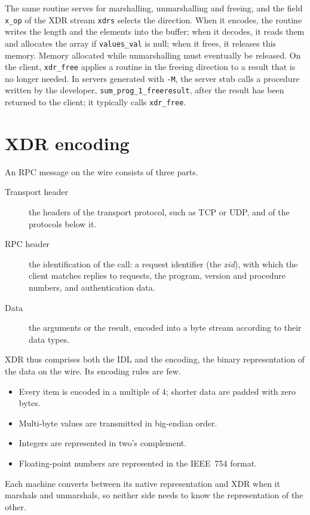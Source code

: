 \documentclass[../main.tex]{subfiles}
\begin{document}
The same routine serves for marshalling, unmarshalling and freeing, and
the field \texttt{x\_op} of the XDR stream \texttt{xdrs} selects the
direction.  When it encodes, the routine writes the length and the
elements into the buffer; when it decodes, it reads them and allocates the
array if \texttt{values\_val} is null; when it frees, it releases this
memory.  Memory allocated while unmarshalling must eventually be released.
On the client, \texttt{xdr\_free} applies a routine in the freeing direction
to a result that is no longer needed.  In servers generated with
\texttt{-M}, the server stub calls a procedure written by the developer,
\texttt{sum\_prog\_1\_freeresult}, after the result has been returned to
the client; it typically calls \texttt{xdr\_free}.

\section{XDR encoding}
\label{sec:l13-encoding}

An RPC message on the wire consists of three parts.
\begin{description}
  \item[Transport header] the headers of the transport protocol, such as
    TCP or UDP, and of the protocols below it.
  \item[RPC header] the identification of the call: a request identifier
    (the \emph{xid}), with which the client matches replies to requests,
    the program, version and procedure numbers, and authentication data.
  \item[Data] the arguments or the result, encoded into a byte stream
    according to their data types.
\end{description}
XDR thus comprises both the IDL and the encoding, the binary representation
of the data on the wire.  Its encoding rules are few.
\begin{itemize}
  \item Every item is encoded in a multiple of \SI{4}{\byte}; shorter data
    are padded with zero bytes.
  \item Multi-byte values are transmitted in big-endian order.
  \item Integers are represented in two's complement.
  \item Floating-point numbers are represented in the IEEE~754 format.
\end{itemize}
Each machine converts between its native representation and XDR when it
marshals and unmarshals, so neither side needs to know the representation
of the other.
\end{document}
